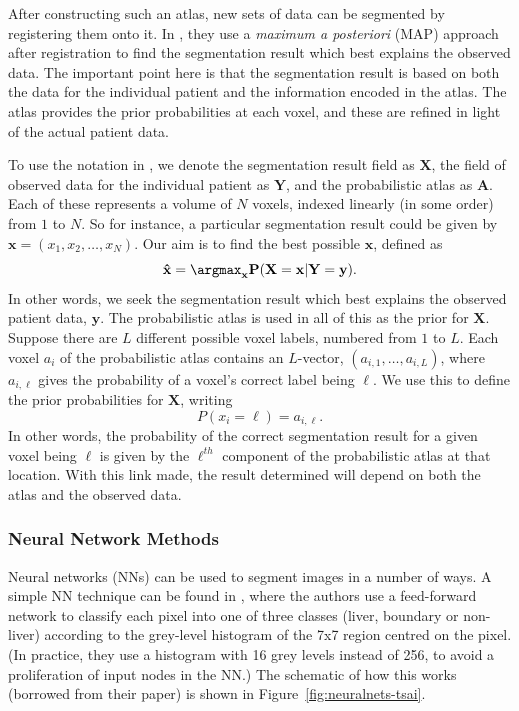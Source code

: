 After constructing such an atlas, new sets of data can be segmented by registering them onto it. In \cite{park03}, they use a \emph{maximum a posteriori} (MAP) approach after registration to find the segmentation result which best explains the observed data. The important point here is that the segmentation result is based on both the data for the individual patient and the information encoded in the atlas. The atlas provides the prior probabilities at each voxel, and these are refined in light of the actual patient data.

To use the notation in \cite{park03}, we denote the segmentation result field as $\mathbf{X}$, the field of observed data for the individual patient as $\mathbf{Y}$, and the probabilistic atlas as $\mathbf{A}$. Each of these represents a volume of $N$ voxels, indexed linearly (in some order) from $1$ to $N$. So for instance, a particular segmentation result could be given by $\mathbf{x} = (x_1, x_2, \ldots, x_N)$. Our aim is to find the best possible $\mathbf{x}$, defined as
%
\[
\mathbf{\hat{x}} = \argmax_{\mathbf{x}} \mathbf{P}(\mathbf{X} = \mathbf{x} | \mathbf{Y} = \mathbf{y}).
\]
%
In other words, we seek the segmentation result which best explains the observed patient data, $\mathbf{y}$. The probabilistic atlas is used in all of this as the prior for $\mathbf{X}$. Suppose there are $L$ different possible voxel labels, numbered from $1$ to $L$. Each voxel $a_i$ of the probabilistic atlas contains an $L$-vector, $(a_{i,1}, \ldots, a_{i,L})$, where $a_{i,\ell}$ gives the probability of a voxel's correct label being $\ell$. We use this to define the prior probabilities for $\mathbf{X}$, writing
%
\[
P(x_i = \ell) = a_{i,\ell}.
\]
%
In other words, the probability of the correct segmentation result for a given voxel being $\ell$ is given by the $\ell^{th}$ component of the probabilistic atlas at that location. With this link made, the result determined will depend on both the atlas and the observed data.

\subsubsection{Neural Network Methods}


Neural networks (NNs) can be used to segment images in a number of ways. A simple NN technique can be found in \cite{tsai94}, where the authors use a feed-forward network to classify each pixel into one of three classes (liver, boundary or non-liver) according to the grey-level histogram of the 7x7 region centred on the pixel. (In practice, they use a histogram with 16 grey levels instead of 256, to avoid a proliferation of input nodes in the NN.) The schematic of how this works (borrowed from their paper) is shown in Figure~\ref{fig:neuralnets-tsai}.

